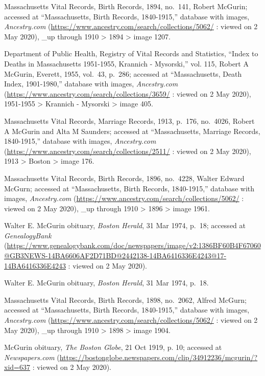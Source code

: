 \begin{thebibliography}{999}
Massachusetts Vital Records, Birth Records, 1894, no.\ 141, Robert McGurin; accessed at ``Massachusetts, Birth Records, 1840-1915,'' database with images, \textit{Ancestry.com} (\url{https://www.ancestry.com/search/collections/5062/} : viewed on 2 May 2020), \_up through 1910 > 1894 > image 1207.

Department of Public Health, Registry of Vital Records and Statistics, ``Index to Deaths in Massachusetts 1951-1955, Krannich - Mysorski,'' vol. 115, Robert A McGurin, Everett, 1955, vol.\ 43, p.\ 286; accessed at ``Massachusetts, Death Index, 1901-1980,'' database with images, \textit{Ancestry.com} (\url{https://www.ancestry.com/search/collections/3659/} : viewed on 2 May 2020), 1951-1955 > Krannich - Mysorski > image 405.

Massachusetts Vital Records, Marriage Records, 1913, p.\ 176, no.\ 4026, Robert A McGurin and Alta M Saunders; accessed at ``Massachusetts, Marriage Records, 1840-1915,'' database with images, \textit{Ancestry.com} (\url{https://www.ancestry.com/search/collections/2511/} : viewed on 2 May 2020), 1913 > Boston > image 176.

Massachusetts Vital Records, Birth Records, 1896, no.\ 4228, Walter Edward McGurn; accessed at ``Massachusetts, Birth Records, 1840-1915,'' database with images, \textit{Ancestry.com} (\url{https://www.ancestry.com/search/collections/5062/} : viewed on 2 May 2020), \_up through 1910 > 1896 > image 1961.

Walter E. McGurin obituary, \textit{Boston Herald}, 31 Mar 1974, p.\ 18; accessed at \textit{GenealogyBank} (\url{https://www.genealogybank.com/doc/newspapers/image/v2:1386BF60B4F67060@GB3NEWS-14BA6606AF2D71BD@2442138-14BA6416336E4243@17-14BA6416336E4243} : viewed on 2 May 2020).

Walter E. McGurin obituary, \textit{Boston Herald}, 31 Mar 1974, p.\ 18.

Massachusetts Vital Records, Birth Records, 1898, no.\ 2062, Alfred McGurn; accessed at ``Massachusetts, Birth Records, 1840-1915,'' database with images, \textit{Ancestry.com} (\url{https://www.ancestry.com/search/collections/5062/} : viewed on 2 May 2020), \_up through 1910 > 1898 > image 1904.

McGurin obituary, \textit{The Boston Globe}, 21 Oct 1919, p. 10; accessed at \textit{Newspapers.com} (\url{https://bostonglobe.newspapers.com/clip/34912236/mcgurin/?xid=637} : viewed on 2 May 2020).


\end{thebibliography}
